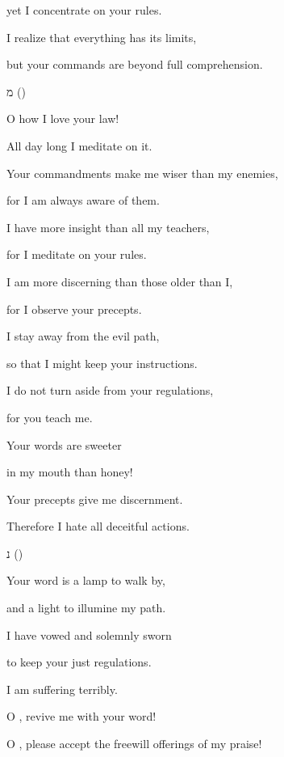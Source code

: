 {\par }{\Q yet I concentrate
on your rules.
\par }{\Q {}I realize
that everything
has its limits,
\par }{\Q but your commands
are beyond full
comprehension.
\par }{\SH מ ({})
\par }{\Q {}O how I love your law!
\par }{\Q All day long I meditate on it.
\par }{\Q {}Your commandments
make me wiser
than my enemies,
\par }{\Q for
I am always aware of them.
\par }{\Q {}I have more insight
than all
my teachers,
\par }{\Q for
I meditate
on your rules.
\par }{\Q {}I am more discerning
than those older
than I,
\par }{\Q for
I observe
your precepts.
\par }{\Q {}I stay away
from the evil
path,
\par }{\Q so that I might
keep
your instructions.
\par }{\Q {}I do not
turn aside
from your regulations,
\par }{\Q for
you
teach me.
\par }{\Q {}Your words
are sweeter
\par }{\Q in my mouth
than honey!
\par }{\Q {}Your precepts
give me discernment.
\par }{\Q Therefore
I hate
all
deceitful
actions.
\par }{\SH נ ({})
\par }{\Q {}Your word is a lamp to walk by,
\par }{\Q and a light to illumine my path.
\par }{\Q {}I have vowed and solemnly
sworn
\par }{\Q to keep
your just regulations.
\par }{\Q {}I am suffering terribly.
\par }{\Q O
{}, revive
me with your word!
\par }{\Q {}O
{}, please
accept
the freewill
offerings of my praise!

}
